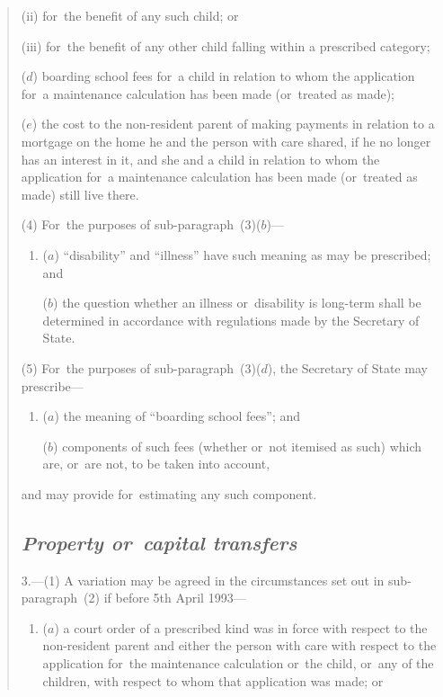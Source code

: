 \documentclass[12pt,a4paper]{article}
\begin{document}
\begin{quotation}
\begin{enumerate}
\begin{enumerate}
(ii) for~the benefit of any such child; or

(iii) for~the benefit of any other child falling within a prescribed category;
\end{enumerate}

($d$) boarding school fees for~a child in relation to whom the application for~a maintenance calculation has been made (or~treated as made);

($e$) the cost to the non-resident parent of making payments in relation to a mortgage on the home he and the person with care shared, if he no longer has an interest in it, and she and a child in relation to whom the application for~a maintenance calculation has been made (or~treated as made) still live there.
\end{enumerate}

(4) For~the purposes of sub-paragraph~(3)($b$)—
\begin{enumerate}\item[]
($a$) “disability” and “illness” have such meaning as may be prescribed; and

($b$) the question whether an illness or~disability is long-term shall be determined in accordance with regulations made by the Secretary of State.
\end{enumerate}

(5) For~the purposes of sub-paragraph~(3)($d$), the Secretary of State may prescribe—
\begin{enumerate}\item[]
($a$) the meaning of “boarding school fees”; and

($b$) components of such fees (whether or~not itemised as such) which are, or~are not, to be taken into account,
\end{enumerate}
and may provide for~estimating any such component.

\subsection*{\itshape Property or~capital transfers}

3.---(1) A variation may be agreed in the circumstances set out in sub-paragraph~(2)  if before 5th April 1993—
\begin{enumerate}\item[]
($a$) a court order of a prescribed kind was in force with respect to the non-resident parent and either the person with care with respect to the application for~the maintenance calculation or~the child, or~any of the children, with respect to whom that application was made; or


\end{enumerate}
\end{quotation}
\end{document}

